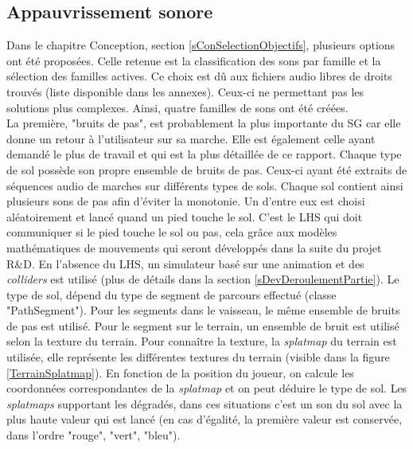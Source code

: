 	\subsection*{Appauvrissement sonore}
		Dans le chapitre Conception, section \ref{sConSelectionObjectifs}, plusieurs options ont été proposées. Celle retenue est la classification des sons par famille et la sélection des familles actives. Ce choix est dû aux fichiers audio libres de droits trouvés (liste disponible dans les annexes). Ceux-ci ne permettant pas les solutions plus complexes. Ainsi, quatre familles de sons ont été créées.
		\\
		
		La première, "bruits de pas", est probablement la plus importante du SG car elle donne un retour à l'utilisateur sur sa marche. Elle est également celle ayant demandé le plus de travail et qui est la plus détaillée de ce rapport. Chaque type de sol possède son propre ensemble de bruits de pas. Ceux-ci ayant été extraits de séquences audio de marches sur différents types de sols. Chaque sol contient ainsi plusieurs sons de pas afin d'éviter la monotonie. Un d'entre eux est choisi aléatoirement et lancé quand un pied touche le sol. C'est le LHS qui doit communiquer si le pied touche le sol ou pas, cela grâce aux modèles mathématiques de mouvements qui seront développés dans la suite du projet R\&D. En l'absence du LHS, un simulateur basé sur une animation et des \textit{colliders} est utilisé (plus de détails dans la section \ref{sDevDeroulementPartie}). Le type de sol, dépend du type de segment de parcours effectué (classe "PathSegment"). Pour les segments dans le vaisseau, le même ensemble de bruits de pas est utilisé. Pour le segment sur le terrain, un ensemble de bruit est utilisé selon la texture du terrain. Pour connaître la texture, la \textit{splatmap} du terrain est utilisée, elle représente les différentes textures du terrain (visible dans la figure \ref{TerrainSplatmap}). En fonction de la position du joueur, on calcule les coordonnées correspondantes de la \textit{splatmap} et on peut déduire le type de sol. Les \textit{splatmaps} supportant les dégradés, dans ces situations c'est un son du sol avec la plus haute valeur qui est lancé (en cas d'égalité, la première valeur est conservée, dans l'ordre "rouge", "vert", "bleu").\medskip
		
